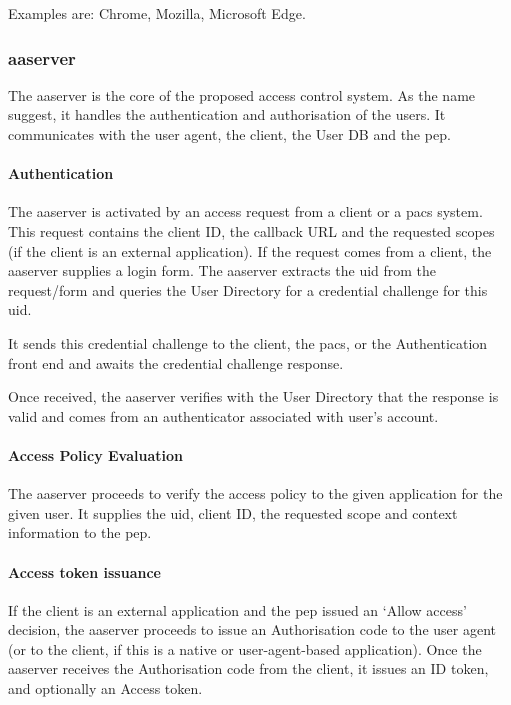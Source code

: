 Examples are: Chrome, Mozilla, Microsoft Edge.

\subsubsection{\acrlong{aaserver}} 
The \acrfull{aaserver} is the core of the proposed access control system. As the name suggest, it handles the authentication and authorisation of the users. It communicates with the user agent, the client, the User DB and the \acrshort{pep}.
    
\paragraph{Authentication}
The \acrshort{aaserver} is activated by an access request from a client or a \acrshort{pacs} system. This request contains the client ID, the callback URL and the requested scopes (if the client is an external application). If the request comes from a client, the \acrshort{aaserver} supplies a login form. The \acrshort{aaserver} extracts the \acrshort{uid} from the request/form and queries the User Directory for a credential challenge for this \acrshort{uid}. 

It sends this credential challenge to the client, the \acrshort{pacs}, or the Authentication front end and awaits the credential challenge response. 

Once received, the \acrshort{aaserver} verifies with the User Directory that the response is valid and comes from an authenticator associated with user's account.

\paragraph{Access Policy Evaluation}
The \acrshort{aaserver} proceeds to verify the access policy to the given application for the given user. It supplies the \acrshort{uid}, client ID, the requested scope and context information to the \acrshort{pep}.

\paragraph{Access token issuance}
If the client is an external application and the \acrshort{pep} issued an `Allow access' decision, the \acrshort{aaserver} proceeds to issue an Authorisation code to the user agent (or to the client, if this is a native or user-agent-based application). Once the \acrshort{aaserver} receives the Authorisation code from the client, it issues an ID token, and optionally an Access token.
    

